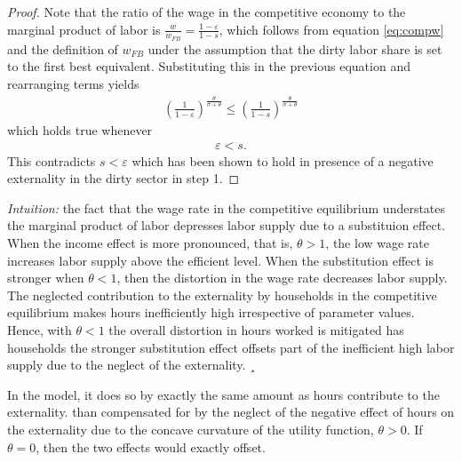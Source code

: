 \begin{proof}
	Note that the ratio of the wage in the competitive economy to the marginal product of labor is $\frac{w}{w_{FB}}=\frac{1-\varepsilon}{1-s}$, which follows from equation \ref{eq:compw} and the definition of $w_{FB}$ under the assumption that the dirty labor share is set to the first best equivalent. Substituting this in the previous equation and rearranging terms yields
	\begin{align}
	\left(\frac{1}{1-\varepsilon}\right)^\frac{\theta}{\sigma+\theta}\leq \left(\frac{1}{1-s}\right)^\frac{\theta}{\sigma+\theta}
	\end{align}
	which holds true whenever
	\begin{align}
	\varepsilon<s.
	\end{align}
	This contradicts $s<\varepsilon$ which has been shown to hold in presence of a negative externality in the dirty sector in step 1. 
\end{proof}

\textit{Intuition:} the fact that the wage rate in the competitive equilibrium understates the marginal product of labor  depresses labor supply due to a substituion effect. When the income effect is more pronounced, that is, $\theta>1$, the low wage rate increases labor supply above the efficient level. When the substitution effect is stronger when $\theta<1$, then the distortion in the wage rate decreases labor supply. 
The neglected contribution to the externality by households in the competitive equilibrium makes hours inefficiently high irrespective of parameter values. 
Hence, with $\theta<1$ the overall distortion in hours worked is mitigated has households the stronger substitution effect offsets part of the inefficient high labor supply due to the neglect of the externality. ¸

In the model, it does so by exactly the same amount as hours contribute to the externality. 
than compensated for by the neglect of the negative effect of hours on the externality due to the concave curvature of the utility function, $\theta>0$. If $\theta=0$, then the two effects would exactly offset. 



